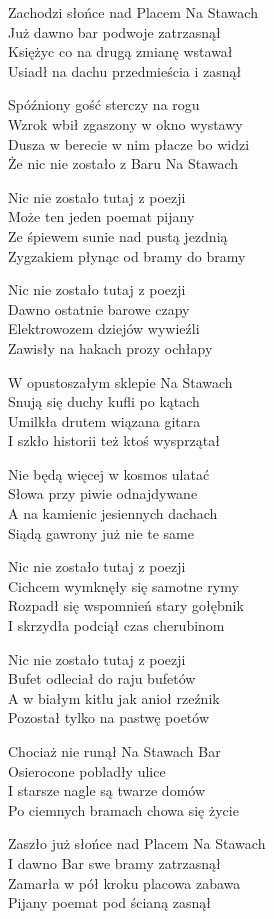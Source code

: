 \begin{text}
Zachodzi słońce nad Placem Na Stawach\\
Już dawno bar podwoje zatrzasnął\\
Księżyc co na drugą zmianę wstawał\\
Usiadł na dachu przedmieścia i zasnął

Spóźniony gość sterczy na rogu\\
Wzrok wbił zgaszony w okno wystawy\\
Dusza w berecie w nim płacze bo widzi\\
Że nic nie zostało z Baru Na Stawach

Nic nie zostało tutaj z poezji\\
Może ten jeden poemat pijany\\
Ze śpiewem sunie nad pustą jezdnią\\
Zygzakiem płynąc od bramy do bramy

Nic nie zostało tutaj z poezji\\
Dawno ostatnie barowe czapy\\
Elektrowozem dziejów wywieźli\\
Zawisły na hakach prozy ochłapy

\hfill\break
W opustoszałym sklepie Na Stawach\\
Snują się duchy kufli po kątach\\
Umilkła drutem wiązana gitara\\
I szkło historii też ktoś wysprzątał

Nie będą więcej w kosmos ulatać\\
Słowa przy piwie odnajdywane\\
A na kamienic jesiennych dachach\\
Siądą gawrony już nie te same

Nic nie zostało tutaj z poezji\\
Cichcem wymknęły się samotne rymy\\
Rozpadł się wspomnień stary gołębnik\\
I skrzydła podciął czas cherubinom

Nic nie zostało tutaj z poezji\\
Bufet odleciał do raju bufetów\\
A w białym kitlu jak anioł rzeźnik\\
Pozostał tylko na pastwę poetów

Chociaż nie runął Na Stawach Bar\\
Osierocone pobladły ulice\\
I starsze nagle są twarze domów\\
Po ciemnych bramach chowa się życie

Zaszło już słońce nad Placem Na Stawach\\
I dawno Bar swe bramy zatrzasnął\\
Zamarła w pół kroku placowa zabawa\\
Pijany poemat pod ścianą zasnął
\end{text}
